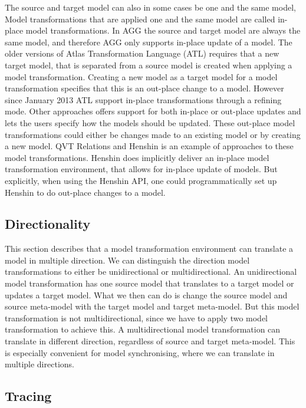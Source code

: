 The source and target model can also in some cases be one and the same model,
Model transformations that are applied one and the same model are called
in-place model transformations. In AGG the source and target model are always
the same model, and therefore AGG only supports in-place update of a model.
The older versions of Atlas Transformation Language (ATL) requires that a new
target model, that is separated from a source model is created when applying a
model transformation. Creating a new model as a target model for a model
transformation specifies that this is an out-place change to a model. However
since January 2013 ATL support in-place transformations through a refining
mode. Other approaches offers support for both in-place or out-place updates
and lets the users specify how the models should be updated. These out-place
model transformations could either be changes made to an existing model or by
creating a new model. QVT Relations and Henshin is an example of approaches to
these model transformations. Henshin does implicitly deliver an in-place model
transformation environment, that allows for in-place update of models. But
explicitly, when using the Henshin API, one could programmatically set up
Henshin to do out-place changes to a model.

\subsection{Directionality}

This section describes that a model transformation environment can translate a
model in multiple direction. We can distinguish the direction model
transformations to either be unidirectional or multidirectional. An
unidirectional model transformation has one source model that translates to a
target model or updates a target model. What we then can do is change the source
model and source meta-model with the target model and target meta-model. But
this model transformation is not multidirectional, since we have to apply two
model transformation to achieve this. A multidirectional model transformation
can translate in different direction, regardless of source and target
meta-model. This is especially convenient for model synchronising, where we can
translate in multiple directions. 

\subsection{Tracing}

